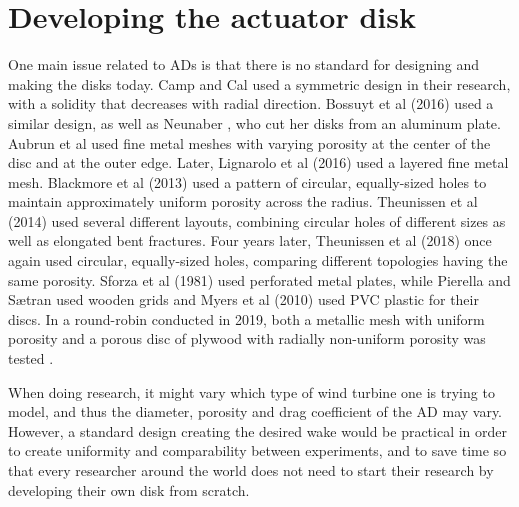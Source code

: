 \section{Developing the actuator disk}

One main issue related to \gls{AD}s is that there is no standard for designing and making the disks today. Camp and Cal \cite{Camp2016} \cite{Camp2019} used a symmetric design in their research, with a solidity that decreases with radial direction. Bossuyt et al (2016) \cite{Bossuyt2016} used a similar design, as well as Neunaber \cite{Neunaber}, who cut her disks from an aluminum plate. Aubrun et al \cite{Aubrun2013} used fine metal meshes with varying porosity at the center of the disc and at the outer edge. Later, Lignarolo et al (2016) \cite{Lignarolo2016} used a layered fine metal mesh. Blackmore et al (2013) \cite{Blackmore2013} used a pattern of circular, equally-sized holes to maintain approximately uniform porosity across the radius. Theunissen et al (2014) \cite{Theunissen2014} used several different layouts, combining circular holes of different sizes as well as elongated bent fractures. Four years later, Theunissen et al (2018) \cite{Theunissen2019} once again used circular, equally-sized holes, comparing different topologies having the same porosity. Sforza et al (1981) \cite{Sforza1981} used perforated metal plates, while Pierella and Sætran \cite{Pierella2010} used wooden grids and Myers et al (2010) \cite{Myers2010} used PVC plastic for their discs. In a round-robin conducted in 2019, both a metallic mesh with uniform porosity and a porous disc of plywood with radially non-uniform porosity was tested \cite{Aubrun2019}.

When doing research, it might vary which type of wind turbine one is trying to model, and thus the diameter, porosity and drag coefficient of the \gls{AD} may vary. However, a standard design creating the desired wake would be practical in order to create uniformity and comparability between experiments, and to save time so that every researcher around the world does not need to start their research by developing their own disk from scratch.  






